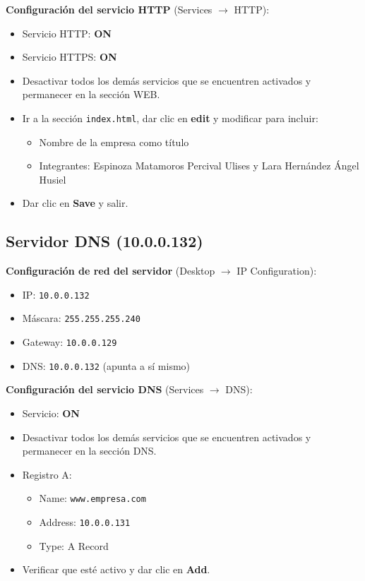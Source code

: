 \documentclass[letterpaper,11pt]{article}
\begin{document}
\textbf{Configuración del servicio HTTP} (Services $\rightarrow$ HTTP):
\begin{itemize}
    \item Servicio HTTP: \textbf{ON}
    \item Servicio HTTPS: \textbf{ON}
    \item Desactivar todos los demás servicios que se encuentren activados y permanecer en la sección WEB.
    \item Ir a la sección \texttt{index.html}, dar clic en \textbf{edit} y modificar para incluir:
    \begin{itemize}
        \item Nombre de la empresa como título
        \item Integrantes: Espinoza Matamoros Percival Ulises y Lara Hernández Ángel Husiel
    \end{itemize}
    \item Dar clic en \textbf{Save} y salir.
\end{itemize}

\subsection{Servidor DNS (10.0.0.132)}

\textbf{Configuración de red del servidor} (Desktop $\rightarrow$ IP Configuration):
\begin{itemize}
    \item IP: \texttt{10.0.0.132}
    \item Máscara: \texttt{255.255.255.240}
    \item Gateway: \texttt{10.0.0.129}
    \item DNS: \texttt{10.0.0.132} (apunta a sí mismo)
\end{itemize}

\textbf{Configuración del servicio DNS} (Services $\rightarrow$ DNS):
\begin{itemize}
    \item Servicio: \textbf{ON}
    \item Desactivar todos los demás servicios que se encuentren activados y permanecer en la sección DNS.
    \item Registro A:
    \begin{itemize}
        \item Name: \texttt{www.empresa.com}
        \item Address: \texttt{10.0.0.131}
        \item Type: A Record
    \end{itemize}
    \item Verificar que esté activo y dar clic en \textbf{Add}.
\end{itemize}
\end{document}
